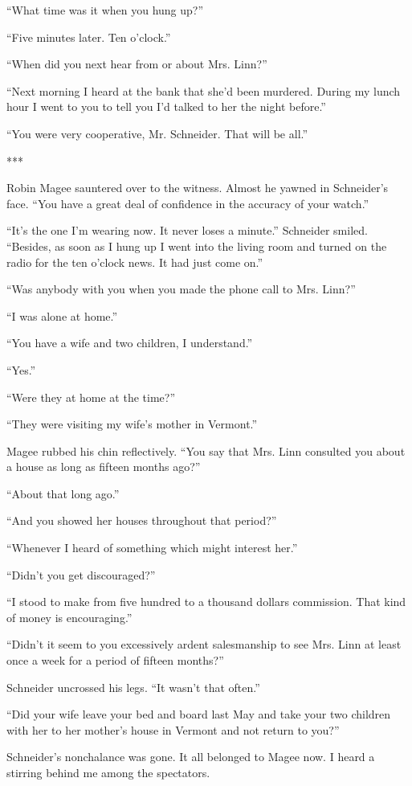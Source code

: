 \documentclass{novel}
\begin{document}
{“What time was it when you hung up?”

“Five minutes later. Ten o’clock.”

“When did you next hear from or about Mrs. Linn?”

“Next morning I heard at the bank that she’d been murdered. During my lunch hour I went to you to tell you I’d talked to her the night before.”

“You were very cooperative, Mr. Schneider. That will be all.”

***

Robin Magee sauntered over to the witness. Almost he yawned in Schneider’s face. “You have a great deal of confidence in the accuracy of your watch.”

“It’s the one I’m wearing now. It never loses a minute.” Schneider smiled. “Besides, as soon as I hung up I went into the living room and turned on the radio for the ten o’clock news. It had just come on.”

“Was anybody with you when you made the phone call to Mrs. Linn?”

“I was alone at home.”

“You have a wife and two children, I understand.”

“Yes.”

“Were they at home at the time?”

“They were visiting my wife’s mother in Vermont.”

Magee rubbed his chin reflectively. “You say that Mrs. Linn consulted you about a house as long as fifteen months ago?”

“About that long ago.”

“And you showed her houses throughout that period?”

“Whenever I heard of something which might interest her.”

“Didn’t you get discouraged?”

“I stood to make from five hundred to a thousand dollars commission. That kind of money is encouraging.”

“Didn’t it seem to you excessively ardent salesmanship to see Mrs. Linn at least once a week for a period of fifteen months?”

Schneider uncrossed his legs. “It wasn’t that often.”

“Did your wife leave your bed and board last May and take your two children with her to her mother’s house in Vermont and not return to you?”

Schneider’s nonchalance was gone. It all belonged to Magee now. I heard a stirring behind me among the spectators.

}
\end{document}
